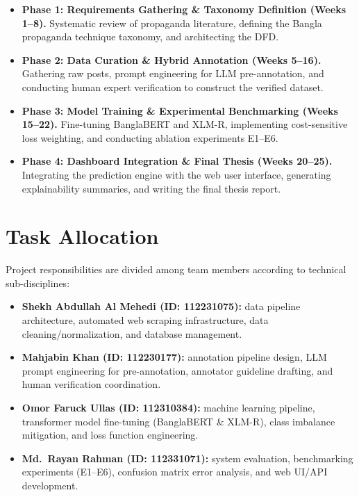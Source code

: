 \documentclass[12pt,a4paper]{report}
\begin{document}
\begin{itemize}
  \item \textbf{Phase 1: Requirements Gathering \& Taxonomy Definition (Weeks
        1--8).} Systematic review of propaganda literature, defining the Bangla
        propaganda technique taxonomy, and architecting the DFD.
  \item \textbf{Phase 2: Data Curation \& Hybrid Annotation (Weeks 5--16).}
        Gathering raw posts, prompt engineering for LLM pre-annotation, and
        conducting human expert verification to construct the verified dataset.
  \item \textbf{Phase 3: Model Training \& Experimental Benchmarking (Weeks
        15--22).} Fine-tuning BanglaBERT and XLM-R, implementing cost-sensitive
        loss weighting, and conducting ablation experiments E1--E6.
  \item \textbf{Phase 4: Dashboard Integration \& Final Thesis (Weeks 20--25).}
        Integrating the prediction engine with the web user interface, generating
        explainability summaries, and writing the final thesis report.
\end{itemize}

\section{Task Allocation}
\label{sec:tasks}
Project responsibilities are divided among team members according to technical
sub-disciplines:
\begin{itemize}
  \item \textbf{Shekh Abdullah Al Mehedi (ID: 112231075):} data pipeline
        architecture, automated web scraping infrastructure, data
        cleaning/normalization, and database management.
  \item \textbf{Mahjabin Khan (ID: 112230177):} annotation pipeline design, LLM
        prompt engineering for pre-annotation, annotator guideline drafting, and
        human verification coordination.
  \item \textbf{Omor Faruck Ullas (ID: 112310384):} machine learning pipeline,
        transformer model fine-tuning (BanglaBERT \& XLM-R), class imbalance
        mitigation, and loss function engineering.
  \item \textbf{Md.\ Rayan Rahman (ID: 112331071):} system evaluation, benchmarking
        experiments (E1--E6), confusion matrix error analysis, and web UI/API
        development.
\end{itemize}
\end{document}
